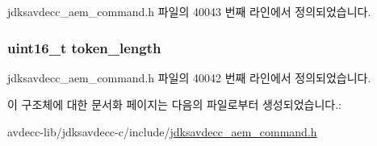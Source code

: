 jdksavdecc\+\_\+aem\+\_\+command.\+h 파일의 40043 번째 라인에서 정의되었습니다.

\subsubsection[{\texorpdfstring{token\+\_\+length}{token_length}}]{\setlength{\rightskip}{0pt plus 5cm}uint16\+\_\+t token\+\_\+length}\hypertarget{structjdksavdecc__aem__command__authenticate_a97da4c134a2723b8dbcd1c88d8577991}{}\label{structjdksavdecc__aem__command__authenticate_a97da4c134a2723b8dbcd1c88d8577991}


jdksavdecc\+\_\+aem\+\_\+command.\+h 파일의 40042 번째 라인에서 정의되었습니다.



이 구조체에 대한 문서화 페이지는 다음의 파일로부터 생성되었습니다.\+:\begin{DoxyCompactItemize}
\item 
avdecc-\/lib/jdksavdecc-\/c/include/\hyperlink{jdksavdecc__aem__command_8h}{jdksavdecc\+\_\+aem\+\_\+command.\+h}\end{DoxyCompactItemize}
